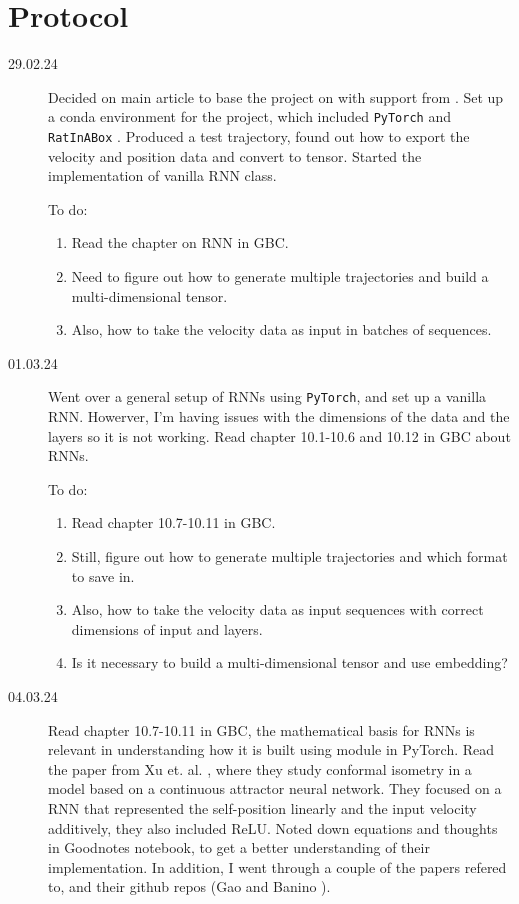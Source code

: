 \section{Protocol}\label{sec:protocol}
\begin{description}
    \item[29.02.24] Decided on main article to base the project on \cite{sorscher:2023:unified_theory} with support from \cite{banino:2018:vector_based}. Set up a conda environment for the project, which included \verb|PyTorch| and \verb|RatInABox| \cite{george:2022:ratinabox}. Produced a test trajectory, found out how to export the velocity and position data and convert to tensor. Started the implementation of vanilla RNN class.
    
    To do:
    \begin{enumerate}
        \item Read the chapter on RNN in GBC.
        \item Need to figure out how to generate multiple trajectories and build a multi-dimensional tensor.
        \item Also, how to take the velocity data as input in batches of sequences. 
    \end{enumerate}

    \item[01.03.24] Went over a general setup of RNNs using \verb|PyTorch|, and set up a vanilla RNN. Howerver, I'm having issues with the dimensions of the data and the layers so it is not working. Read chapter 10.1-10.6 and 10.12 in GBC \cite{gbc:2016:deep_learning} about RNNs.

    To do:
    \begin{enumerate}
        \item Read chapter 10.7-10.11 in GBC.
        \item Still, figure out how to generate multiple trajectories and which format to save in.
        \item Also, how to take the velocity data as input sequences with correct dimensions of input and layers.
        \item Is it necessary to build a multi-dimensional tensor and use embedding?
    \end{enumerate}

    \item[04.03.24] Read chapter 10.7-10.11 in GBC, the mathematical basis for RNNs is relevant in understanding how it is built using module in PyTorch. Read the paper from Xu et. al. \cite{xu:2022:conformal}, where they study conformal isometry in a model based on a continuous attractor neural network. They focused on a RNN that represented the self-position linearly and the input velocity additively, they also included ReLU. Noted down equations and thoughts in Goodnotes notebook, to get a better understanding of their implementation. In addition, I went through a couple of the papers refered to, and their github repos (Gao \cite{gao:2019:learning_gridlike, gao:2021:path_integration} and Banino \cite{banino:2018:vector_based}). 


\end{description}
